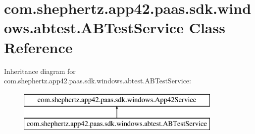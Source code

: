 \hypertarget{classcom_1_1shephertz_1_1app42_1_1paas_1_1sdk_1_1windows_1_1abtest_1_1_a_b_test_service}{\section{com.\+shephertz.\+app42.\+paas.\+sdk.\+windows.\+abtest.\+A\+B\+Test\+Service Class Reference}
\label{classcom_1_1shephertz_1_1app42_1_1paas_1_1sdk_1_1windows_1_1abtest_1_1_a_b_test_service}
}
Inheritance diagram for com.\+shephertz.\+app42.\+paas.\+sdk.\+windows.\+abtest.\+A\+B\+Test\+Service\+:\begin{figure}[H]
\begin{center}
\leavevmode
\includegraphics[height=2.000000cm]{classcom_1_1shephertz_1_1app42_1_1paas_1_1sdk_1_1windows_1_1abtest_1_1_a_b_test_service}
\end{center}
\end{figure}
